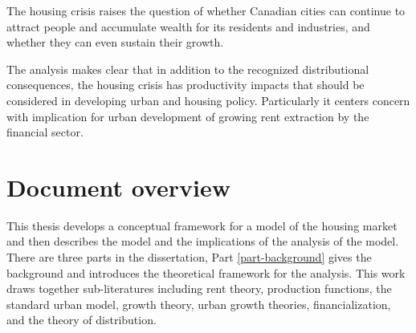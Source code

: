 
The housing crisis raises the question of whether Canadian cities can continue to attract people and accumulate wealth for its residents and industries, and whether they can even sustain their growth.





The analysis makes clear that in addition to the recognized distributional consequences, the housing crisis has productivity impacts that should be considered in developing urban and housing policy. Particularly it centers concern with implication for urban development of growing rent extraction by the financial sector. 

\section{Document overview}

This thesis develops a conceptual framework for a model of the housing market and then describes the model and the implications of the analysis of the model. %
There are three parts in the dissertation, Part \ref{part-background} gives the background and introduces the theoretical framework for the analysis. This work draws together sub-literatures including rent theory, production functions, the standard urban model, growth theory, urban growth theories, financialization, and the theory of distribution. 

